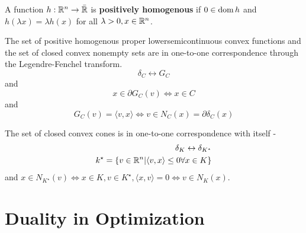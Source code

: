 \begin{defn}
  \label{defn:conjugate_functions:9}
  A function $h: \mathbb{R}^{n} \rightarrow \bar {\mathbb{R}}$ is \textbf{positively
    homogenous} if $0 \in \operatorname*{dom} h$ and $h(\lambda x) = \lambda h(x)$
  for all $\lambda > 0, x \in \mathbb{R}^{n}$.
\end{defn}

\begin{proposition}
  The set of positive homogenous proper lowersemicontinuous convex
  functions and the set of closed convex nonempty sets are in
  one-to-one correspondence through the Legendre-Fenchel transform.
  \begin{equation}
    \label{eq:64}
    \delta_{C} \leftrightarrow G_{C}    
  \end{equation}
  and
  \begin{equation}
    \label{eq:65}
    x \in \partial G_{C}(v) \iff x \in C
  \end{equation}
  and
  \begin{equation}
    \label{eq:66}
    G_{C}(v) = \langle v, x \rangle \iff v \in N_{C}(x) = \partial \delta_{C}(x)
  \end{equation}

  The set of closed convex cones is in one-to-one correspondence with
  itself -
  \begin{align}
    \label{eq:67}
    \delta_{K} \leftrightarrow \delta_{K^{\star}} \\
    k^{\star} = \{ v \in \mathbb{R}^{n} | \langle v, x \rangle \leq 0 \forall
    x \in K \}
  \end{align}
  and $x \in N_{K^{\star}}(v) \iff x \in K, v \in K^{\star}, \langle
  x, v \rangle = 0 \iff v \in N_{K}(x)$.
\end{proposition}

\chapter{Duality in Optimization}
\label{cha:duality-optimization}

